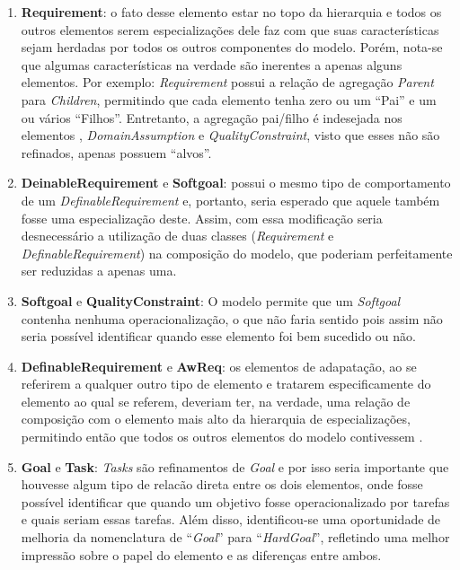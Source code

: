 \begin{enumerate}
	\item \textbf{Requirement}: o fato desse elemento estar no topo da hierarquia e todos os outros elementos serem especializações dele faz com que suas características sejam herdadas por todos os outros componentes do modelo. Porém, nota-se que algumas características na verdade são inerentes a apenas alguns elementos. Por exemplo: \textit{Requirement} possui a relação de agregação \textit{Parent} para \textit{Children}, permitindo que cada elemento tenha zero ou um ``Pai'' e um ou vários ``Filhos''. Entretanto, a agregação pai/filho é indesejada nos elementos \awreq, \textit{DomainAssumption} e \textit{QualityConstraint}, visto que esses não são refinados, apenas possuem ``alvos''. \label{p1}
	
	\item \textbf{DeinableRequirement} e \textbf{Softgoal}: \sofgoal possui o mesmo tipo de comportamento de um \textit{DefinableRequirement} e, portanto, seria esperado que aquele também fosse uma especialização deste. Assim, com essa modificação seria desnecessário a utilização de duas classes (\textit{Requirement} e \textit{DefinableRequirement}) na composição do modelo, que poderiam perfeitamente ser reduzidas a apenas uma. \label{p2}
	
	\item \textbf{Softgoal} e \textbf{QualityConstraint}: O modelo permite que um \textit{Softgoal} contenha nenhuma operacionalização, o que não faria sentido pois assim não seria possível identificar quando esse elemento foi bem sucedido ou não. \label{p3}
	
	\item \textbf{DefinableRequirement} e \textbf{AwReq}: os elementos de adapatação, ao se referirem a qualquer outro tipo de elemento e tratarem especificamente do elemento ao qual se referem, deveriam ter, na verdade, uma relação de composição com o elemento mais alto da hierarquia de especializações, permitindo então que todos os outros elementos do modelo contivessem \awreqs. \label{p4}
	
	\item \textbf{Goal} e \textbf{Task}: \textit{Tasks} são refinamentos de \textit{Goal} e por isso seria importante que houvesse algum tipo de relacão direta entre os dois elementos, onde fosse possível identificar que quando um objetivo fosse operacionalizado por tarefas e quais seriam essas tarefas. Além disso, identificou-se uma oportunidade de melhoria da nomenclatura de ``\textit{Goal}'' para ``\textit{HardGoal}'', refletindo uma melhor impressão sobre o papel do elemento e as diferenças entre ambos. \label{p5}
	

\end{enumerate}
